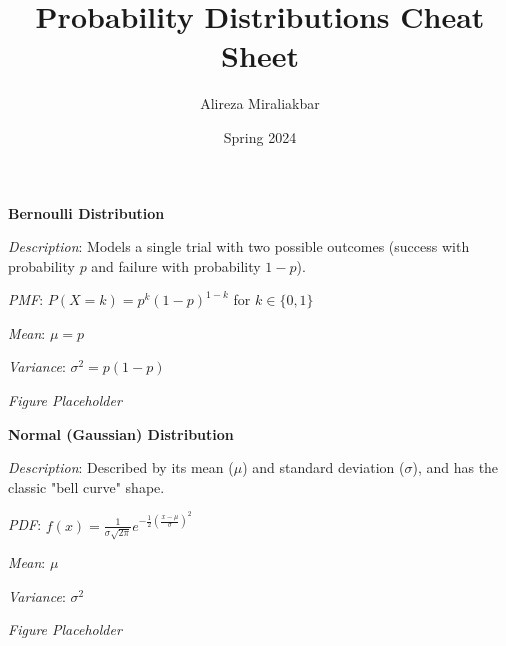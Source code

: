 \documentclass{article}
\title{Probability Distributions Cheat Sheet}
\author{Alireza Miraliakbar}
\date{Spring 2024}
\begin{document}
\maketitle

\begin{mdframed}
\textbf{Bernoulli Distribution}

\textit{Description}: Models a single trial with two possible outcomes (success with probability $p$ and failure with probability $1-p$).

\textit{PMF}: $P(X=k) = p^k(1-p)^{1-k}$ for $k \in \{0,1\}$

\textit{Mean}: $\mu = p$

\textit{Variance}: $\sigma^2 = p(1-p)$

\textit{Figure Placeholder}

\end{mdframed}

\vspace{1cm}

\begin{mdframed}
\textbf{Normal (Gaussian) Distribution}

\textit{Description}: Described by its mean ($\mu$) and standard deviation ($\sigma$), and has the classic "bell curve" shape.

\textit{PDF}: $f(x) = \frac{1}{\sigma\sqrt{2\pi}} e^{-\frac{1}{2}\left(\frac{x-\mu}{\sigma}\right)^2}$

\textit{Mean}: $\mu$

\textit{Variance}: $\sigma^2$

\textit{Figure Placeholder}

\end{mdframed}

\end{document}
